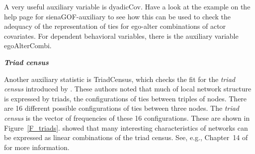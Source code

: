 \documentclass[a4paper,fleqn,11pt]{article}
\newcommand{\+}{\, + \,}
\newcommand{\sfn}[1]{\textsf{#1}}
\begin{document}
A very useful auxiliary variable is \sfn{dyadicCov}. Have a look at the example
on the help page for  \sfn{sienaGOF-auxiliary} to see how this can be used
to check the adequacy of the representation of ties for ego-alter combinations
of actor covariates. For dependent behavioral variables, there is the
auxiliary variable \sfn{egoAlterCombi}.
\medskip

\noindent
\textbf{\emph{Triad census}}
\smallskip

\noindent
Another auxiliary statistic is \sfn{TriadCensus},
which checks the fit for the \emph{triad census}
introduced by \citet{HollandLeinhardt1970,HollandLeinhardt1976}.
These authors noted that
much of local network structure is expressed by triads,
the configurations of ties between triples of nodes.
There are 16 different possible configurations of ties between three nodes.
The \emph{triad census} is the vector of frequencies of these 16 configurations.
These are shown in Figure~\ref{F_triads}.
\citet{HollandLeinhardt1976} showed that many interesting characteristics
of networks can be expressed as linear combinations of the
triad census.
See, e.g., Chapter~14 of \citet{WassermanFaust94} for more information.
\end{document}
